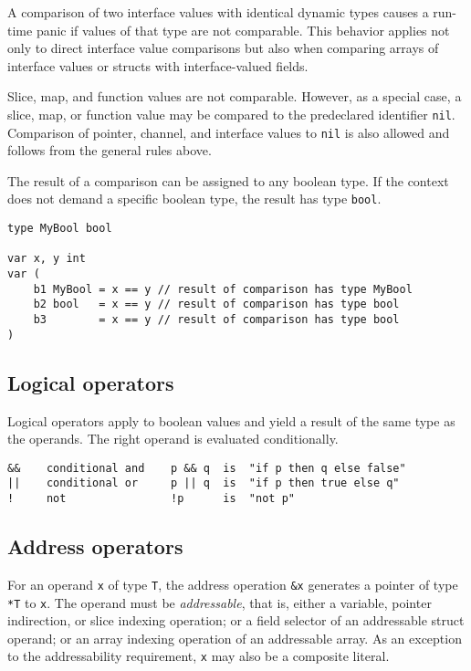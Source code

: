 A comparison of two interface values with identical dynamic types causes
a run-time panic if values of that type
are not comparable. This behavior applies not only to direct interface
value comparisons but also when comparing arrays of interface values or
structs with interface-valued fields.

Slice, map, and function values are not comparable. However, as a
special case, a slice, map, or function value may be compared to the
predeclared identifier \texttt{nil}. Comparison of pointer, channel, and
interface values to \texttt{nil} is also allowed and follows from the
general rules above.

The result of a comparison can be assigned to any boolean type. If the
context does not demand a specific boolean type, the result has type
\texttt{bool}.

\begin{Verbatim}[frame=single]
type MyBool bool

var x, y int
var (
    b1 MyBool = x == y // result of comparison has type MyBool
    b2 bool   = x == y // result of comparison has type bool
    b3        = x == y // result of comparison has type bool
)
\end{Verbatim}

\subsection*{Logical operators}

Logical operators apply to boolean values and
yield a result of the same type as the operands. The right operand is
evaluated conditionally.

\begin{Verbatim}[frame=single]
&&    conditional and    p && q  is  "if p then q else false"
||    conditional or     p || q  is  "if p then true else q"
!     not                !p      is  "not p"
\end{Verbatim}

\subsection*{Address operators}

For an operand \texttt{x} of type \texttt{T}, the address operation
\texttt{\&x} generates a pointer of type \texttt{*T} to \texttt{x}. The
operand must be \emph{addressable}, that is, either a variable, pointer
indirection, or slice indexing operation; or a field selector of an
addressable struct operand; or an array indexing operation of an
addressable array. As an exception to the addressability requirement,
\texttt{x} may also be a composite literal.

